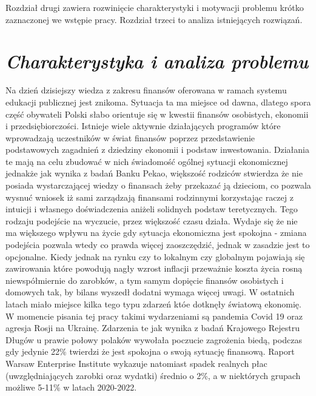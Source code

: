 \documentclass[a4paper,10pt, twoside]{report}
\newcommand{\customstylechapter}[1]{\large{\textit{#1}}}
\begin{document}
{Rozdział drugi zawiera rozwinięcie charakterystyki i motywacji problemu krótko 
zaznaczonej we wstępie pracy. Rozdział trzeci to analiza istniejących rozwiązań.}

\chapter{\customstylechapter{Charakterystyka i analiza problemu}}

{Na dzień dzisiejszy wiedza z zakresu finansów oferowana w ramach systemu 
edukacji publicznej jest znikoma\cite{edukacjafinansowawszkołach}. Sytuacja ta 
ma miejsce od dawna, dlatego spora część obywateli Polski słabo orientuje się w 
kwestii finansów osobistych, ekonomii i przedsiębiorczości. Istnieje wiele 
aktywnie działających programów które wprowadzają uczestników w świat finansów 
poprzez przedstawienie podstawowych zagadnień z dziedziny ekonomii i podstaw 
inwestowania\cite{edukacjafinansowawszkołach}. Działania te mają na celu 
zbudować w nich świadomość ogólnej sytuacji ekonomicznej jednakże jak wynika z 
badań Banku Pekao\cite{edukacjafinansowamlodziezy}, większość rodziców stwierdza
 że nie posiada wystarczającej wiedzy o finansach żeby przekazać ją dzieciom, 
co pozwala wysnuć wniosek iż sami zarządzają finansami rodzinnymi korzystając 
raczej z intuicji i własnego doświadczenia aniżeli solidnych podstaw 
teretycznych. Tego rodzaju podejście na wyczucie, przez większość czasu działa. 
Wydaje się że nie ma większego wpływu na życie gdy sytuacja ekonomiczna jest 
spokojna - zmiana podejścia pozwala wtedy co prawda więcej zaoszczędzić, jednak 
w zasadzie jest to opcjonalne. Kiedy jednak na rynku czy to lokalnym czy 
globalnym pojawiają się zawirowania które powodują nagły wzrost inflacji 
przeważnie koszta życia rosną niewspółmiernie do 
zarobków\cite{gussytuacjabudzetowa}, a tym samym dopięcie finansów osobistych i 
domowych tak, by bilans wyszedł dodatni wymaga więcej uwagi. W ostatnich latach 
miało miejsce kilka tego typu zdarzeń któe dotknęły światową ekonomię. W 
momencie pisania tej pracy takimi wydarzeniami są pandemia Covid 19 oraz agresja
 Rosji na Ukrainę. Zdarzenia te jak wynika z badań Krajowego Rejestru Długów 
\cite{portfelpolakawpandemii} u prawie połowy polaków wywołała poczucie 
zagrożenia biedą, podczas gdy jedynie 22\% twierdzi że jest spokojna o swoją 
sytuację finansową. Raport Warsaw Enterprise Institute \cite{weiinflacja} 
wykazuje natomiast spadek realnych płac (uwzględniających zarobki oraz wydatki) 
średnio o 2\%, a w niektórych grupach możliwe 5-11\% w latach 2020-2022.}
\end{document}
